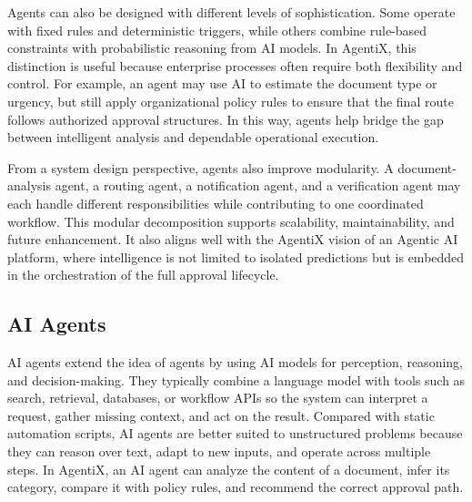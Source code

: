 \documentclass[12pt,oneside,openright,a4paper]{cpe-english-project}
\begin{document}
Agents can also be designed with different levels of sophistication.
Some operate with fixed rules and deterministic triggers, while others
combine rule-based constraints with probabilistic reasoning from AI
models. In AgentiX, this distinction is useful because enterprise
processes often require both flexibility and control. For example, an
agent may use AI to estimate the document type or urgency, but still
apply organizational policy rules to ensure that the final route follows
authorized approval structures. In this way, agents help bridge the gap
between intelligent analysis and dependable operational execution.

From a system design perspective, agents also improve modularity. A
document-analysis agent, a routing agent, a notification agent, and a
verification agent may each handle different responsibilities while
contributing to one coordinated workflow. This modular decomposition
supports scalability, maintainability, and future enhancement. It also
aligns well with the AgentiX vision of an Agentic AI platform, where
intelligence is not limited to isolated predictions but is embedded in
the orchestration of the full approval lifecycle.

\vspace{1em}

\subsection{AI Agents}

AI agents extend the idea of agents by using AI models for perception,
reasoning, and decision-making. They typically combine a language model
with tools such as search, retrieval, databases, or workflow APIs so the
system can interpret a request, gather missing context, and act on the
result. Compared with static automation scripts, AI agents are better
suited to unstructured problems because they can reason over text,
adapt to new inputs, and operate across multiple steps. In AgentiX, an
AI agent can analyze the content of a document, infer its category,
compare it with policy rules, and recommend the correct approval path.

\vspace{1em}
\end{document}
